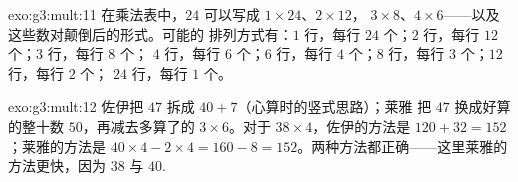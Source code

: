 \begin{solution}{exo:g3:mult:11}
在乘法表中，$24$ 可以写成 $1 \times 24$、$2 \times 12$，
$3 \times 8$、$4 \times 6$——以及这些数对颠倒后的形式。可能的
排列方式有：$1$ 行，每行 $24$ 个；$2$ 行，每行 $12$ 个；$3$ 行，每行 $8$ 个；
$4$ 行，每行 $6$ 个；$6$ 行，每行 $4$ 个；$8$ 行，每行 $3$ 个；$12$ 行，每行 $2$ 个；
$24$ 行，每行 $1$ 个。
\end{solution}

\begin{solution}{exo:g3:mult:12}
佐伊把 $47$ 拆成 $40 + 7$（心算时的竖式思路）；莱雅
把 $47$ 换成好算的整十数 $50$，再减去多算了的
$3 \times 6$。对于 $38 \times 4$，佐伊的方法是
$120 + 32 = 152$；莱雅的方法是 $40 \times 4 - 2 \times 4 = 160 - 8 =
152$。两种方法都正确——这里莱雅的方法更快，因为 $38$ 与
$40$.
\end{solution}
